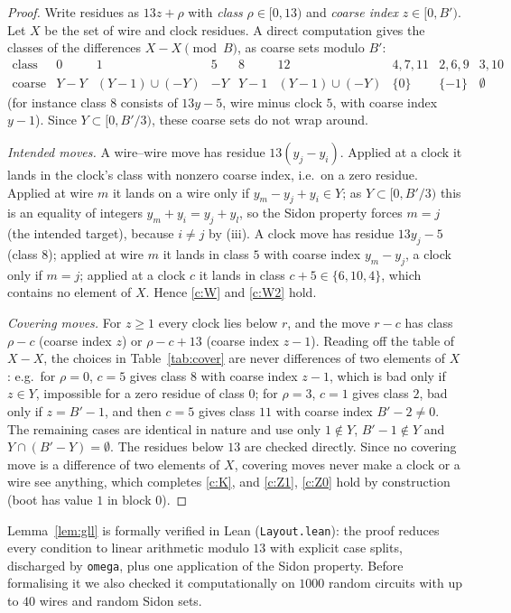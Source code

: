 \documentclass[11pt]{article}
\theoremstyle{definition}
\begin{document}
\begin{proof}
Write residues as $13z+\rho$ with \emph{class} $\rho\in[0,13)$ and \emph{coarse index} $z\in[0,B')$.
Let $X$ be the set of wire and clock residues.  A direct computation gives the classes of the
differences $X-X \pmod B$, as coarse sets modulo $B'$:
\[
\begin{array}{c|ccccccccc}
\text{class} & 0 & 1 & 5 & 8 & 12 & 4,7,11 & 2,6,9 & 3,10\\\hline
\text{coarse} & Y-Y & (Y-1)\cup(-Y) & -Y & Y-1 & (Y-1)\cup(-Y) & \{0\} & \{-1\} & \emptyset
\end{array}
\]
(for instance class $8$ consists of $13y-5$, wire minus clock $5$, with coarse index $y-1$).
Since $Y\subset[0,B'/3)$, these coarse sets do not wrap around.

\emph{Intended moves.}  A wire--wire move has residue $13(y_j-y_i)$.  Applied at a clock it lands in
the clock's class with nonzero coarse index, i.e.\ on a zero residue.  Applied at wire $m$ it lands on
a wire only if $y_m-y_j+y_i\in Y$; as $Y\subset[0,B'/3)$ this is an equality of integers
$y_m+y_i=y_j+y_l$, so the Sidon property forces $m=j$ (the intended target), because $i\ne j$ by
(iii).  A clock move has residue $13y_j-5$ (class $8$); applied at wire $m$ it lands in class $5$ with
coarse index $y_m-y_j$, a clock only if $m=j$; applied at a clock $c$ it lands in class
$c+5\in\{6,10,4\}$, which contains no element of $X$.  Hence \ref{c:W} and \ref{c:W2} hold.

\emph{Covering moves.}  For $z\ge1$ every clock lies below $r$, and the move $r-c$ has class
$\rho-c$ (coarse index $z$) or $\rho-c+13$ (coarse index $z-1$).  Reading off the table of $X-X$, the
choices in Table~\ref{tab:cover} are never differences of two elements of $X$: e.g.\ for $\rho=0$,
$c=5$ gives class $8$ with coarse index $z-1$, which is bad only if $z\in Y$, impossible for a zero
residue of class $0$; for $\rho=3$, $c=1$ gives class $2$, bad only if $z=B'-1$, and then $c=5$ gives
class $11$ with coarse index $B'-2\ne0$.  The remaining cases are identical in nature and use only
$1\notin Y$, $B'-1\notin Y$ and $Y\cap(B'-Y)=\emptyset$.  The residues below $13$ are checked
directly.  Since no covering move is a difference of two elements of $X$, covering moves never make a
clock or a wire see anything, which completes \ref{c:K}, and \ref{c:Z1}, \ref{c:Z0} hold by
construction (boot has value $1$ in block $0$).
\end{proof}

Lemma~\ref{lem:gll} is formally verified in Lean (\texttt{Layout.lean}): the proof reduces every
condition to linear arithmetic modulo $13$ with explicit case splits, discharged by \texttt{omega},
plus one application of the Sidon property.  Before formalising it we also checked it
computationally on $1000$ random circuits with up to $40$ wires and random Sidon sets.
\end{document}
